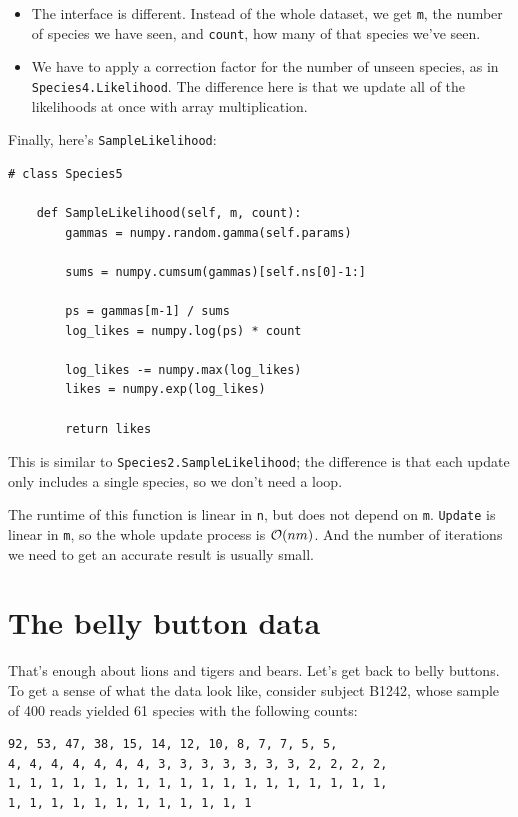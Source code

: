 \documentclass[12pt]{book}
\begin{document}
\begin{itemize}

\item The interface is different.  Instead of the whole dataset, we
  get {\tt m}, the number of species we have seen, and {\tt count},
  how many of that species we've seen.

\item We have to apply a correction factor for the number of unseen
  species, as in {\tt Species4.Likelihood}.  The difference here is
  that we update all of the likelihoods at once with array
  multiplication.

\end{itemize}

Finally, here's {\tt SampleLikelihood}:

\begin{verbatim}
# class Species5

    def SampleLikelihood(self, m, count):
        gammas = numpy.random.gamma(self.params)

        sums = numpy.cumsum(gammas)[self.ns[0]-1:]

        ps = gammas[m-1] / sums
        log_likes = numpy.log(ps) * count

        log_likes -= numpy.max(log_likes)
        likes = numpy.exp(log_likes)

        return likes
\end{verbatim}

This is similar to {\tt Species2.SampleLikelihood}; the
difference is that each update only includes a single species,
so we don't need a loop.

The runtime of this function is linear in {\tt n}, but does not
depend on {\tt m}.  {\tt Update} is linear in {\tt m}, so the
whole update process is $\mathcal{O}(n m)$.  And the number of iterations
we need to get an accurate result is usually small.


\section{The belly button data}
\label{belly}

That's enough about lions and tigers and bears.
Let's get back to belly buttons.  To get a sense of what the
data look like, consider subject B1242,
whose sample of 400 reads yielded 61 species with the following
counts:

\begin{verbatim}
92, 53, 47, 38, 15, 14, 12, 10, 8, 7, 7, 5, 5, 
4, 4, 4, 4, 4, 4, 4, 3, 3, 3, 3, 3, 3, 3, 2, 2, 2, 2,
1, 1, 1, 1, 1, 1, 1, 1, 1, 1, 1, 1, 1, 1, 1, 1, 1, 1,
1, 1, 1, 1, 1, 1, 1, 1, 1, 1, 1, 1
\end{verbatim}
\end{document}

